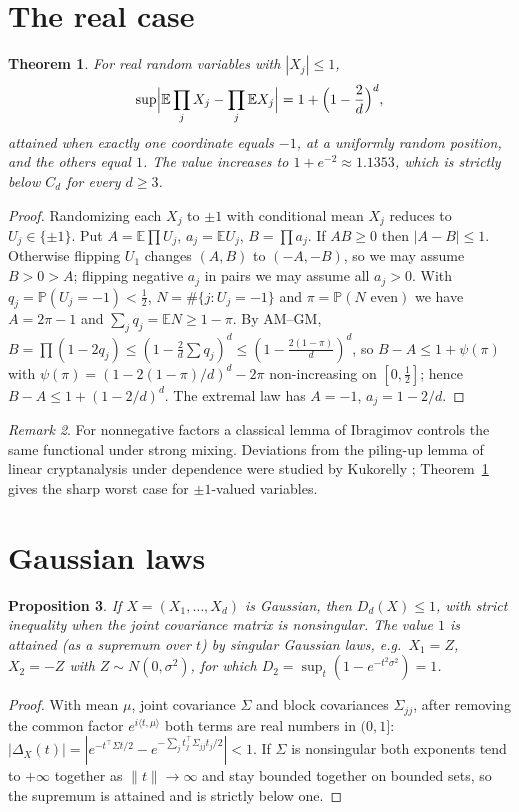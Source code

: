 \documentclass[11pt]{article}
\newtheorem{theorem}{Theorem}[section]
\newtheorem{proposition}[theorem]{Proposition}
\theoremstyle{definition}\newtheorem{definition}[theorem]{Definition}
\theoremstyle{remark}\newtheorem{remark}[theorem]{Remark}
\begin{document}
\section{The real case}
\begin{theorem}\label{thm:real}
For real random variables with $|X_j|\le1$,
\[
\sup\Bigl|\mathbb E\prod_jX_j-\prod_j\mathbb EX_j\Bigr|=1+\Bigl(1-\frac2d\Bigr)^d,
\]
attained when exactly one coordinate equals $-1$, at a uniformly random position, and the others equal $1$. The value
increases to $1+e^{-2}\approx1.1353$, which is strictly below $C_d$ for every $d\ge3$.
\end{theorem}
\begin{proof}
Randomizing each $X_j$ to $\pm1$ with conditional mean $X_j$ reduces to $U_j\in\{\pm1\}$. Put $A=\mathbb E\prod U_j$,
$a_j=\mathbb EU_j$, $B=\prod a_j$. If $AB\ge0$ then $|A-B|\le1$. Otherwise flipping $U_1$ changes $(A,B)$ to $(-A,-B)$, so
we may assume $B>0>A$; flipping negative $a_j$ in pairs we may assume all $a_j>0$. With $q_j=\mathbb P(U_j=-1)<\frac12$,
$N=\#\{j:U_j=-1\}$ and $\pi=\mathbb P(N\text{ even})$ we have $A=2\pi-1$ and $\sum_jq_j=\mathbb EN\ge1-\pi$. By AM--GM,
$B=\prod(1-2q_j)\le(1-\frac2d\sum q_j)^d\le(1-\frac{2(1-\pi)}d)^d$, so $B-A\le1+\psi(\pi)$ with
$\psi(\pi)=(1-2(1-\pi)/d)^d-2\pi$ non-increasing on $[0,\frac12]$; hence $B-A\le1+(1-2/d)^d$. The extremal law has $A=-1$,
$a_j=1-2/d$.
\end{proof}

\begin{remark}
For nonnegative factors a classical lemma of Ibragimov \cite{Ibragimov1962} controls the same functional under strong
mixing. Deviations from the piling-up lemma of linear cryptanalysis \cite{Matsui1994} under dependence were studied by
Kukorelly \cite{Kukorelly1999}; Theorem~\ref{thm:real} gives the sharp worst case for $\pm1$-valued variables.
\end{remark}

\section{Gaussian laws}
\begin{proposition}\label{prop:gauss-all}
If $X=(X_1,\dots,X_d)$ is Gaussian, then $D_d(X)\le1$, with strict inequality when the joint covariance
matrix is nonsingular. The value $1$ is attained (as a supremum over $t$) by singular Gaussian laws, e.g.\ $X_1=Z$,
$X_2=-Z$ with $Z\sim N(0,\sigma^2)$, for which $D_2=\sup_t(1-e^{-t^2\sigma^2})=1$.
\end{proposition}
\begin{proof}
With mean $\mu$, joint covariance $\Sigma$ and block covariances $\Sigma_{jj}$, after removing the common factor
$e^{i\langle t,\mu\rangle}$ both terms are real numbers in $(0,1]$:
$|\Delta_X(t)|=|e^{-t^\top\Sigma t/2}-e^{-\sum_jt_j^\top\Sigma_{jj}t_j/2}|<1$. If $\Sigma$ is nonsingular both
exponents tend to $+\infty$ together as $\|t\|\to\infty$ and stay bounded together on bounded sets, so the
supremum is attained and is strictly below one.
\end{proof}
\end{document}
